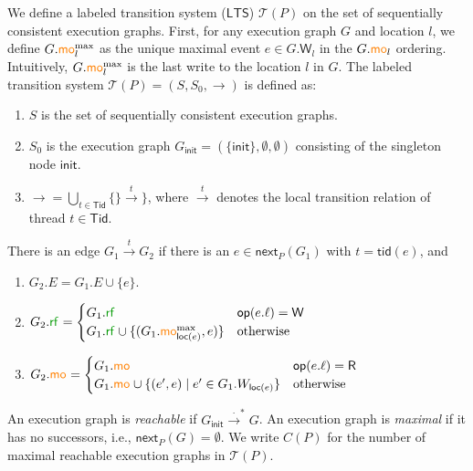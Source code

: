 \documentclass[acmsmall]{acmart}
\def\set#1{{\{ #1 \}}}
\def\tuple#1{{\langle #1\rangle}}
\newcommand{\opw}{\mathsf{W}}
\newcommand{\opr}{\mathsf{R}}
\newcommand{\op}{\mathsf{op}}
\newcommand{\Tid}{\mathsf{Tid}}
\newcommand{\loc}{\mathsf{loc}}
\newcommand{\tid}{\mathsf{tid}}
\newcommand{\lts}{\mathsf{LTS}}
\newcommand{\init}{\mathsf{init}}
\newcommand{\nextop}{\mathsf{next}}
\newcommand{\rf}[1]{{\textcolor{green!60!black}{\mathsf{rf}}_{#1}}}
\newcommand{\mo}[1]{{\textcolor{orange}{\mathsf{mo}}_{#1}}}
\def\orangemo{\textcolor{orange}{\mathsf{mo}}}
\newcommand{\momax}[1]{{\orangemo^{\max}_{#1}}}
\newcommand{\po}[1]{{\textcolor{darkgray}{\mathsf{po}}_{#1}}}
\newcommand{\inord}{\textcolor{purple}\leq}
\begin{document}
We define a labeled transition system ($\lts$) $\mathcal{T}(P)$ on the set of sequentially consistent execution graphs.  
First, for any execution graph $G$ and location $l$, we define $G.\momax{l}$ as the unique maximal event $e \in G.\opw_l$ in the $G.\mo{l}$ ordering.
Intuitively, $G.\momax{l}$ is the last write to the location $l$ in $G$. 
The labeled transition system $\mathcal{T}(P) = (S, S_0, \xrightarrow{})$ is defined as:
\begin{enumerate}
    \item $S$ is the set of sequentially consistent execution graphs.
    \item $S_0$ is the execution graph $G_{\init} = (\set{\init}, \emptyset, \emptyset)$ consisting of the singleton node $\init$.
    \item $\xrightarrow{} = \bigcup_{t \in \Tid}\{\}\xrightarrow{t}\}$, where $\xrightarrow{t}$ denotes the local transition relation of thread $t \in \Tid$.  
\end{enumerate}
There is an edge $G_1 \xrightarrow{t} G_2$ if
there is an $e\in \nextop_P(G_1)$ with $t = \tid(e)$, and
\begin{enumerate} 
\item $G_2.E = G_1.E \cup \set{e}$.
\item $G_2.\rf{} = \begin{cases} 
G_1.\rf{} & \op(e.\ell) = \opw \\ 
G_1.\rf{} \cup \{(G_1.\momax{\loc(e)}, e)\} & \text{otherwise} 
\end{cases}$
\item $G_2.\mo{}{} = \begin{cases} 
G_1.\mo{}{} & \op(e.\ell) = \opr \\ 
G_1.\mo{} \cup \{(e', e) \mid e' \in G_1.W_{\loc(e)}\} & \text{otherwise} 
\end{cases}$
\end{enumerate}
%
An execution graph is \emph{reachable} if $G_{\init} \xrightarrow{\cdot}^* G$.
An execution graph is \emph{maximal} if it has no successors,
i.e., $\nextop_P(G) = \emptyset$.
We write $C(P)$ for the number of maximal reachable execution graphs in $\mathcal{T}(P)$.
%
\end{document}
